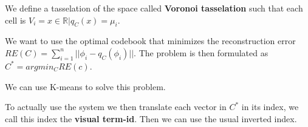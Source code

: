 We define a tasselation of the space called \textbf{Voronoi tasselation} such that
each cell is $V_i={x\in\mathbb{R}|q_C(x)=\mu_i}$.

We want to use the optimal codebook that minimizes the reconstruction error $RE(C)=\sum_{i=1}^{n}||\phi_i-q_C(\phi_i)||$.
The problem is then formulated as $C^*=argmin_CRE(c)$.

We can use K-means to solve this problem.

To actually use the system we then translate each vector in $C^*$ in its index,
we call this index the \textbf{visual term-id}.
Then we can use the usual inverted index.